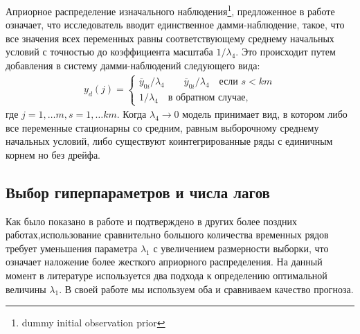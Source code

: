 \documentclass[11pt]{article} %
\newcommand{\post}{\overline}
\begin{document}
Априорное распределение изначального наблюдения\footnote{dummy initial observation prior }, предложенное в работе \cite{sims_1993_nine} означает, что исследователь вводит единственное дамми-наблюдение, такое, что все значения всех переменных равны соответствующему среднему начальных условий с точностью до коэффициента масштаба $1/\lambda_4$. Это происходит  путем добавления в систему дамми-наблюдений следующего вида:
\begin{gather*}
y_d(j)=\begin{cases}\post y_{0i}/\lambda_4 \qquad
\post y_{0i}/\lambda_4\quad \text{если }s<km\\
1/\lambda_4 \quad \text{в обратном случае,}
\end{cases}
\end{gather*}
где $j=1,\ldots m, s=1,\ldots km$. Когда $\lambda_4\to 0 $ модель принимает вид, в котором либо все переменные стационарны со средним, равным выборочному среднему начальных условий, либо существуют коинтегрированные ряды с  единичным корнем но без дрейфа.

\subsection{Выбор гиперпараметров и числа лагов}

Как было показано в работе \cite{demol_al_2008_forecasting} и подтверждено в других более поздних работах,использование сравнительно большого количества временных рядов требует уменьшения параметра $\lambda_1$ с увеличением размерности выборки, что означает наложение более жесткого априорного распределения. На данный момент в литературе используется два подхода к определению оптимальной величины $\lambda_1$. В своей работе мы используем оба и сравниваем качество прогноза.
\end{document}
